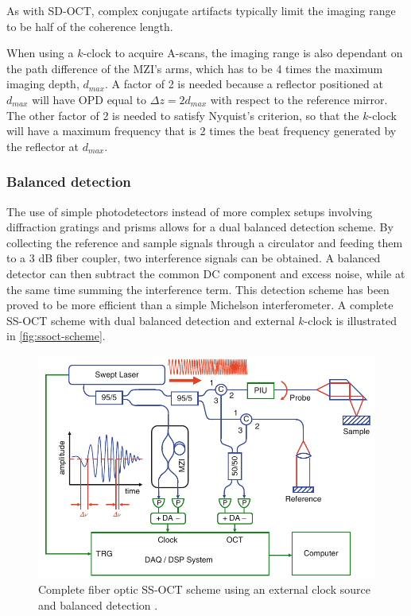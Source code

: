 As with \ac{SD-OCT}, complex conjugate artifacts typically limit the imaging range to be half of the coherence length. 

When using a $k$-clock to acquire A-scans, the imaging range is also dependant on the path difference of the \ac{MZI}'s arms, which has to be 4 times the maximum imaging depth, $d_{max}$. A factor of 2 is needed because a reflector positioned at $d_{max}$ will have \ac{OPD} equal to $\Delta z = 2d_{max}$ with respect to the reference mirror. The other factor of 2 is needed to satisfy Nyquist's criterion, so that the $k$-clock will have a maximum frequency that is 2 times the beat frequency generated by the reflector at $d_{max}$. 

\subsubsection{Balanced detection}
The use of simple photodetectors instead of more complex setups involving diffraction gratings and prisms allows for a dual balanced detection scheme. By collecting the reference and sample signals through a circulator and feeding them to a 3 dB fiber coupler, two interference signals can be obtained. A balanced detector can then subtract the common DC component and excess noise, while at the same time summing the interference term. This detection scheme has been proved to be more efficient than a simple Michelson interferometer. A complete \ac{SS-OCT} scheme with dual balanced detection and external $k$-clock is illustrated in \autoref{fig:ssoct-scheme}.

\begin{figure}[hbt]
	\myfloatalign
	\includegraphics[width=\linewidth]{gfx/ch2/ssoct-scheme}
	\caption{Complete fiber optic SS-OCT scheme using an external clock source and balanced detection \cite{Drexler2015}.}\label{fig:ssoct-scheme}
\end{figure}
